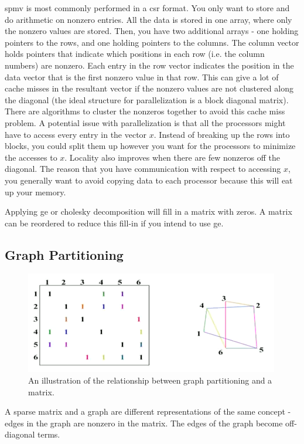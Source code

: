 \documentclass[10pt]{article}
\begin{document}
\begin{flushleft}
\gls{spmv} is most commonly performed in a \gls{csr} format. You only want to store and do arithmetic on nonzero entries. All the data is stored in one array, where only the nonzero values are stored. Then, you have two additional arrays - one holding pointers to the rows, and one holding pointers to the columns. The column vector holds pointers that indicate which positions in each row (i.e. the column numbers) are nonzero. Each entry in the row vector indicates the position in the data vector that is the first nonzero value in that row. This can give a lot of cache misses in the resultant vector if the nonzero values are not clustered along the diagonal (the ideal structure for parallelization is a block diagonal matrix). There are algorithms to cluster the nonzeros together to avoid this cache miss problem. A potential issue with parallelization is that all the processors might have to access every entry in the vector \(x\). Instead of breaking up the rows into blocks, you could split them up however you want for the processors to minimize the accesses to \(x\). Locality also improves when there are few nonzeros off the diagonal. The reason that you have communication with respect to accessing \(x\), you generally want to avoid copying data to each processor because this will eat up your memory.

Applying \gls{ge} or cholesky decomposition will fill in a matrix with zeros. A matrix can be reordered to reduce this fill-in if you intend to use \gls{ge}.

\subsection{Graph Partitioning}

\begin{figure}[H]
\centering
\includegraphics[width=0.75\linewidth]{figures/graph-partitioning.pdf}
\caption{An illustration of the relationship between graph partitioning and a matrix.}
\end{figure}

A sparse matrix and a graph are different representations of the same concept - edges in the graph are nonzero in the matrix. The edges of the graph become off-diagonal terms.


\end{flushleft}
\end{document}
